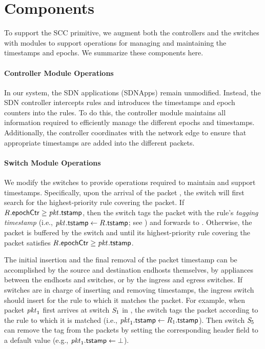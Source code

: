 \section{Components}
\label{sec:architecture}

To support the SCC primitive, we augment both the controllers and the
switches with modules to support operations for managing and
maintaining the timestamps and epochs.  We summarize these components
here.

\paragraph{Controller Module Operations}
In our system, the SDN applications (SDNApps) remain
unmodified. Instead, the SDN controller intercepts rules and
introduces the timestamps and epoch counters into the rules. To do
this, the controller module maintains all information required to
efficiently manage the different epochs and timestamps.  Additionally,
the controller coordinates with the network edge to ensure that
appropriate timestamps are added into the different packets.

\paragraph{Switch Module Operations}
We modify the switches to provide operations required to maintain and
support timestamps.  Specifically, upon the arrival of the packet
\pktID{}, the switch will first search for the highest-priority rule
 covering the packet.  If $\ruleID{}{\epochField} \ge
\pktID{}{\pktTmpField}$, then the switch tags the packet with the
rule's \textit{tagging timestamp}  (i.e.,
$\pktID{}{\pktTmpField} \gets \ruleID{}{\tagTmpField}$; see
) and forwards \pktID{} to .
Otherwise, the packet is buffered by the switch and until its
highest-priority rule  covering the packet satisfies
$\ruleID{}{\epochField} \ge \pktID{}{\pktTmpField}$.

The initial insertion and the final removal of the packet timestamp
\pktID{}{\pktTmpField} can be accomplished by the source and
destination endhosts themselves, by appliances between the endhosts
and switches, or by the ingress and egress switches. If switches are
in charge of inserting and removing timestamps, the ingress switch
should insert  for the rule  to which
it matches the packet.  For example, when packet $\pktID{1}$ first
arrives at switch $\switchID{1}$ in , the switch
tags the packet according to the rule  to which it is
matched (i.e., $\pktID{1}{\pktTmpField} \gets
\ruleID{1}{\tagTmpField}$).  Then switch $\switchID{5}$ can remove the
tag from the packets by setting the corresponding header field to a
default value (e.g., $\pktID{1}{\pktTmpField} \gets \bot$).

